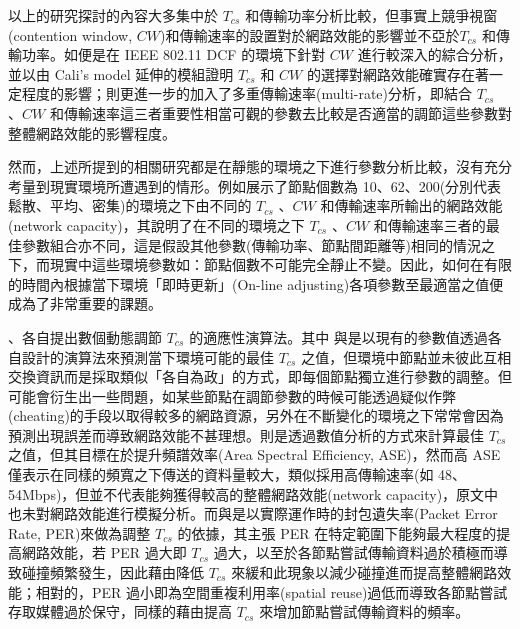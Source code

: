 \documentclass[12pt,a4paper]{article}
\begin{document}
\begin{description}
\begin{enumerate}
以上的研究探討的內容大多集中於 $T_{cs}$ 和傳輸功率分析比較，但事實上競爭視窗(contention window, $CW$)和傳輸速率的設置對於網路效能的影響並不亞於$T_{cs}$ 和傳輸功率。如\cite{infocom08_zeng}便是在 IEEE 802.11 DCF 的環境下針對 $CW$ 進行較深入的綜合分析，並以由 Cali’s model \cite{tn00_cali}延伸的模組證明 $T_{cs}$ 和 $CW$ 的選擇對網路效能確實存在著一定程度的影響；\cite{infocom07_interplay}則更進一步的加入了多重傳輸速率(multi-rate)分析，即結合 $T_{cs}$ 、$CW$ 和傳輸速率這三者重要性相當可觀的參數去比較是否適當的調節這些參數對整體網路效能的影響程度。 

然而，上述所提到的相關研究都是在靜態的環境之下進行參數分析比較，沒有充分考量到現實環境所遭遇到的情形。例如\cite{infocom07_interplay}展示了節點個數為 10、62、200(分別代表鬆散、平均、密集)的環境之下由不同的 $T_{cs}$ 、$CW$ 和傳輸速率所輸出的網路效能(network capacity)，其說明了在不同的環境之下 $T_{cs}$ 、$CW$ 和傳輸速率三者的最佳參數組合亦不同，這是假設其他參數(傳輸功率、節點間距離等)相同的情況之下，而現實中這些環境參數如：節點個數不可能完全靜止不變。因此，如何在有限的時間內根據當下環境「即時更新」(On-line adjusting)各項參數至最適當之值便成為了非常重要的課題。 

\cite{cccn08_phycs}、\cite{tmc09_aphycs,ton09_optwmn,infocom07_optcs,icl13_iter}各自提出數個動態調節 $T_{cs}$ 的適應性演算法。其中\cite{cccn08_phycs} 與\cite{infocom07_optcs}是以現有的參數值透過各自設計的演算法來預測當下環境可能的最佳 $T_{cs}$ 之值，但環境中節點並未彼此互相交換資訊而是採取類似「各自為政」的方式，即每個節點獨立進行參數的調整。但可能會衍生出一些問題，如某些節點在調節參數的時候可能透過疑似作弊(cheating)的手段以取得較多的網路資源，另外在不斷變化的環境之下常常會因為預測出現誤差而導致網路效能不甚理想。\cite{icl13_iter}則是透過數值分析的方式來計算最佳 $T_{cs}$ 之值，但其目標在於提升頻譜效率(Area Spectral Efficiency, ASE)，然而高 ASE 僅表示在同樣的頻寬之下傳送的資料量較大，類似採用高傳輸速率(如 48、54Mbps)，但並不代表能夠獲得較高的整體網路效能(network capacity)，原文中也未對網路效能進行模擬分析。而\cite{tmc09_aphycs}與\cite{ton09_optwmn}是以實際運作時的封包遺失率(Packet Error Rate, PER)來做為調整 $T_{cs}$ 的依據，其主張 PER 在特定範圍下能夠最大程度的提高網路效能，若 PER 過大即 $T_{cs}$ 過大，以至於各節點嘗試傳輸資料過於積極而導致碰撞頻繁發生，因此藉由降低 $T_{cs}$ 來緩和此現象以減少碰撞進而提高整體網路效能；相對的，PER 過小即為空間重複利用率(spatial reuse)過低而導致各節點嘗試存取媒體過於保守，同樣的藉由提高 $T_{cs}$ 來增加節點嘗試傳輸資料的頻率。


\end{enumerate}
\end{description}
\end{document}
